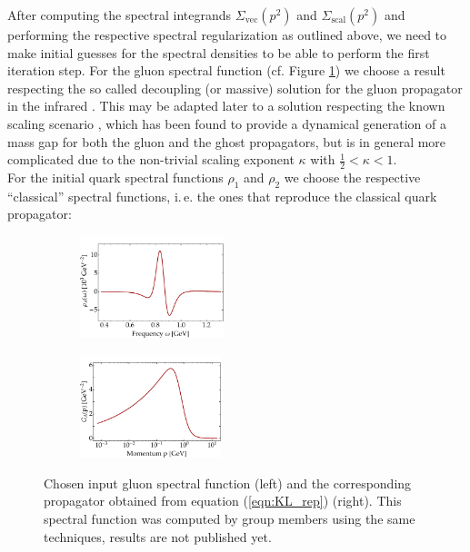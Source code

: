 \noindent After computing the spectral integrands $\Sigma_{\mathrm{vec}}(p^2)$ and $\Sigma_{\mathrm{scal}}(p^2)$ and performing the respective spectral regularization as outlined above, we need to make initial guesses for the spectral densities to be able to perform the first iteration step. For the gluon spectral function (cf. Figure \ref{fig:gluon_specfunc}) we choose a result respecting the so called decoupling (or massive) solution for the gluon propagator in the infrared \cite{vonSmekalAlkoferHauck1997}. This may be adapted later to a solution respecting the known scaling scenario \cite{LercheVonSmekal2002}, which has been found to provide a dynamical generation of a mass gap for both the gluon and the ghost propagators, but is in general more complicated due to the non-trivial scaling exponent $\kappa$ with $\frac{1}{2}<\kappa < 1$. \\
For the initial quark spectral functions $\rho_1$ and $\rho_2$ we choose the respective \enquote{classical} spectral functions, i.\,e. the ones that reproduce the classical quark propagator:
\begin{figure}[t]
\hfill
\begin{subfigure}
	\centering
	\includegraphics[width = 0.46\textwidth, trim= 4em 0 0 0]{figures/GluonSpecFuncPlot}
\end{subfigure}
\hfill
\begin{subfigure}
	\centering
	\includegraphics[width = 0.45\textwidth, trim= 4em 0 0 0]{figures/GluonPropPlot}
	\hfill
\end{subfigure}
	\caption{Chosen input gluon spectral function (left) and the corresponding propagator obtained from equation (\ref{eqn:KL_rep}) (right). This spectral function was computed by group members using the same techniques, results are not published yet.}
	\label{fig:gluon_specfunc}
\end{figure}


